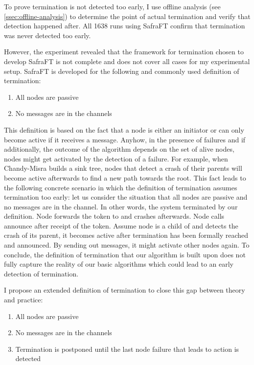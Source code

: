 To prove termination is not detected too early, I use offline analysis (see \cref{ssec:offline-analysis}) to determine the point of actual termination and verify that detection happened after.
All 1638 runs using SafraFT confirm that termination was never detected too early.

However, the experiment revealed that the framework for termination chosen to develop SafraFT is not complete and does not cover all cases for my experimental setup.
SafraFT is developed for the following and commonly used definition of termination:
\begin{enumerate}
	\item All nodes are passive
	\item No messages are in the channels
\end{enumerate}
This definition is based on the fact that a node is either an initiator or can only become active if it receives a message.
Anyhow, in the presence of failures and if additionally, the outcome of the algorithm depends on the set of alive nodes, nodes might get activated by the detection of a failure.
For example, when Chandy-Misra builds a sink tree, nodes that detect a crash of their parents will become active afterwards to find a new path towards the root.
This fact leads to the following concrete scenario in which the definition of termination assumes termination too early: let us consider the situation that all nodes are passive and no messages are in the channel.
In other words, the system terminated by our definition.
Node  forwards the token to  and crashes afterwards.
Node  calls announce after receipt of the token.
Assume node  is a child of  and detects the crash of its parent, it becomes active after termination has been formally reached and announced.
By sending out  messages, it might activate other nodes again.
To conclude, the definition of termination that our algorithm is built upon does not fully capture the reality of our basic algorithms which could lead to an early detection of termination.

I propose an extended definition of termination to close this gap between theory and practice:
\begin{enumerate}
	\item All nodes are passive
	\item No messages are in the channels
	\item Termination is postponed until the last node failure that leads to action is detected
\end{enumerate}

